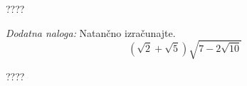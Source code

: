 \documentclass[addpoints]{exam}
\begin{document}
\begin{questions}
         \begin{solution}[10cm]
             ????
         \end{solution}
     
     
     
     
             
     
         \bonusquestion[2]
         \textit{Dodatna naloga:} Natančno izračunajte. $$ \left(\sqrt{2}+\sqrt{5}\right)\sqrt{7-2\sqrt{10}} $$
     
         \begin{solution}[7cm]
            ????
        \end{solution}
     
     
     
     
     \end{questions}
     
     
     
     
\end{document}
